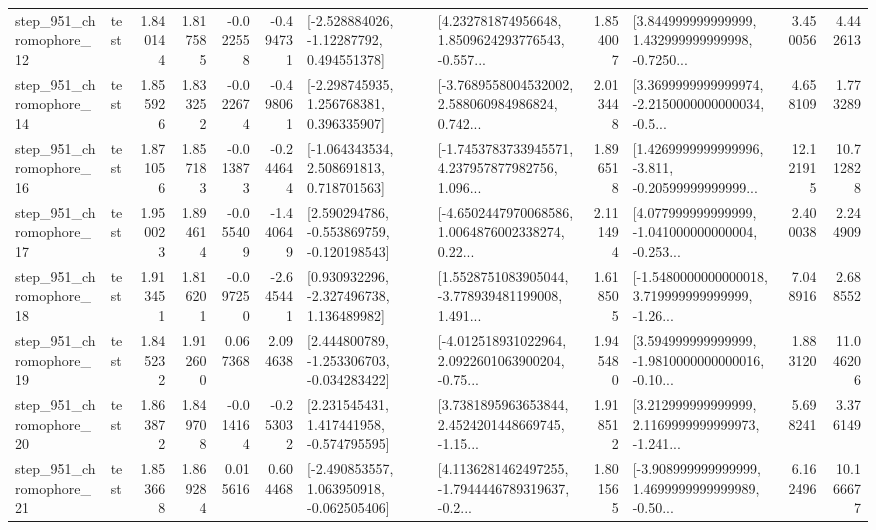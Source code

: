 \begin{tabular}{llrrrrllrlrr}
  step\_951\_chromophore\_12 &      test &      1.840144 &    1.817585 &     -0.022558 & -0.494731 &    [-2.528884026, -1.12287792, 0.494551378] &  [4.232781874956648, 1.8509624293776543, -0.557... &       1.854007 &  [3.844999999999999, 1.432999999999998, -0.7250... &            3.450056 &          4.442613 \\
  step\_951\_chromophore\_14 &      test &      1.855926 &    1.833252 &     -0.022674 & -0.498061 &    [-2.298745935, 1.256768381, 0.396335907] &  [-3.7689558004532002, 2.588060984986824, 0.742... &       2.013448 &  [3.3699999999999974, -2.2150000000000034, -0.5... &            4.658109 &          1.773289 \\
  step\_951\_chromophore\_16 &      test &      1.871056 &    1.857183 &     -0.013873 & -0.244644 &    [-1.064343534, 2.508691813, 0.718701563] &  [-1.7453783733945571, 4.237957877982756, 1.096... &       1.896518 &  [1.4269999999999996, -3.811, -0.20599999999999... &           12.121915 &         10.712828 \\
  step\_951\_chromophore\_17 &      test &      1.950023 &    1.894614 &     -0.055409 & -1.440649 &   [2.590294786, -0.553869759, -0.120198543] &  [-4.6502447970068586, 1.0064876002338274, 0.22... &       2.111494 &  [4.077999999999999, -1.041000000000004, -0.253... &            2.400038 &          2.244909 \\
  step\_951\_chromophore\_18 &      test &      1.913451 &    1.816201 &     -0.097250 & -2.645441 &    [0.930932296, -2.327496738, 1.136489982] &  [1.5528751083905044, -3.778939481199008, 1.491... &       1.618505 &  [-1.5480000000000018, 3.719999999999999, -1.26... &            7.048916 &          2.688552 \\
  step\_951\_chromophore\_19 &      test &      1.845232 &    1.912600 &      0.067368 &  2.094638 &   [2.444800789, -1.253306703, -0.034283422] &  [-4.012518931022964, 2.0922601063900204, -0.75... &       1.945480 &  [3.594999999999999, -1.9810000000000016, -0.10... &            1.883120 &         11.046206 \\
  step\_951\_chromophore\_20 &      test &      1.863872 &    1.849708 &     -0.014164 & -0.253032 &    [2.231545431, 1.417441958, -0.574795595] &  [3.7381895963653844, 2.4524201448669745, -1.15... &       1.918512 &  [3.212999999999999, 2.1169999999999973, -1.241... &            5.698241 &          3.376149 \\
  step\_951\_chromophore\_21 &      test &      1.853668 &    1.869284 &      0.015616 &  0.604468 &   [-2.490853557, 1.063950918, -0.062505406] &  [4.1136281462497255, -1.7944446789319637, -0.2... &       1.801565 &  [-3.908999999999999, 1.4699999999999989, -0.50... &            6.162496 &         10.166677 \\

\end{tabular}
